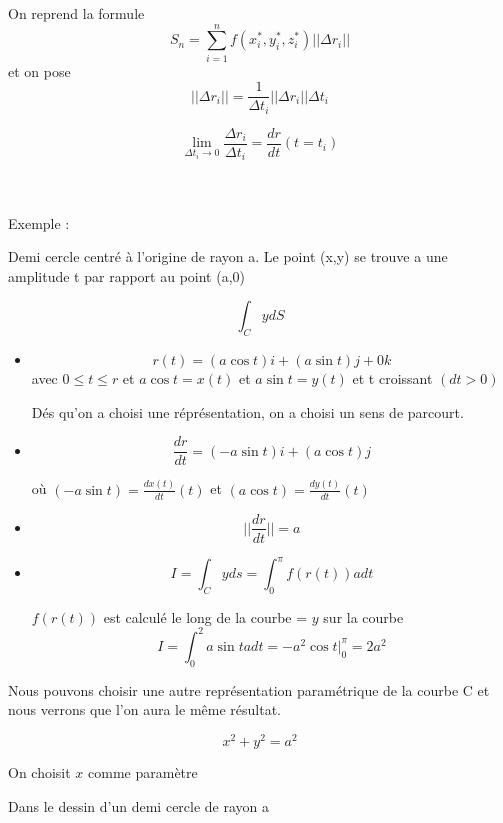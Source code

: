 On reprend la formule
\[S_n=\sum_{i=1}^nf(x_i^*,y_i^*,z_i^*)||\Delta r_i||\]
 et on pose \[||\Delta r_i ||=\frac{1}{\Delta t_i}||\Delta r_i|| \Delta t_i\]


 \[\lim_{\Delta t_i \to 0} \frac{\Delta r_i}{\Delta t_i} = \frac{dr}{dt}(t=t_i)\]

 \\\\
 Exemple :

 Demi cercle centré à l'origine de rayon a. Le point (x,y) se trouve a une amplitude t par rapport au point (a,0)

 \[\int_C y dS\]

 \begin{itemize}

 \item
 \[r(t) = (a \cos t ) i + ( a \sin t )j +0k\]
avec $ 0\leqslant t \leqslant r $ et $a \cos t =x(t)$ et $a \sin t = y(t)$ et t croissant $(dt>0)$

Dés qu'on a choisi une réprésentation, on a choisi un sens de parcourt.
\item
\[\frac{dr}{dt}=(-a\sin t )i + (a \cos t ) j\]

 où $(-a\sin t ) = \frac{dx(t)}{dt}(t)$ et $(a\cos t ) = \frac{dy(t)}{dt}(t)$

\item $$||\frac{dr}{dt}||=a$$
\item $$I = \int_C y ds = \int_0^{\pi} f(r(t))adt$$

$f(r(t))$ est calculé le long de la courbe = $y$ sur la courbe
\[I=\int_0^2 a \sin t a dt = -a^2 \cos t \left. \right|^\pi_0=2a^2\]
 \end{itemize}

Nous pouvons choisir une autre représentation paramétrique de la courbe C et nous verrons que l'on aura le même résultat.

\[x^2+y^2 = a^2\]

On choisit $x$ comme paramètre

Dans le dessin d'un demi cercle de rayon a

